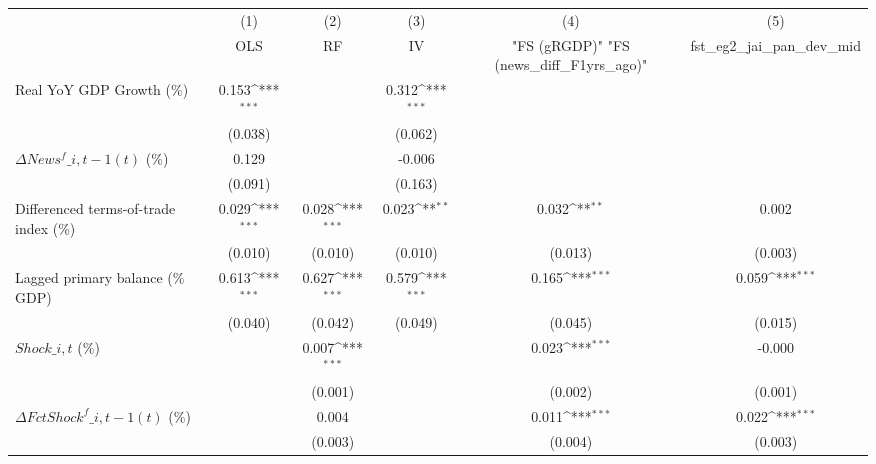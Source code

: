 {
\def\sym#1{\ifmmode^{#1}\else\(^{#1}\)\fi}
\begin{tabular}{l*{5}{c}}
\toprule
                    &\multicolumn{1}{c}{(1)}&\multicolumn{1}{c}{(2)}&\multicolumn{1}{c}{(3)}&\multicolumn{1}{c}{(4)}&\multicolumn{1}{c}{(5)}\\
                    &\multicolumn{1}{c}{OLS}&\multicolumn{1}{c}{RF}&\multicolumn{1}{c}{IV}&\multicolumn{1}{c}{ "FS (gRGDP)"  "FS (news\_diff\_F1yrs\_ago)" }&\multicolumn{1}{c}{fst\_eg2\_jai\_pan\_dev\_mid}\\
\midrule
Real YoY GDP Growth (\%)&       0.153\sym{***}&                     &       0.312\sym{***}&                     &                     \\
                    &     (0.038)         &                     &     (0.062)         &                     &                     \\
\addlinespace
$ \Delta News^f\_{i,t-1}(t)$ (\%)&       0.129         &                     &      -0.006         &                     &                     \\
                    &     (0.091)         &                     &     (0.163)         &                     &                     \\
\addlinespace
Differenced terms-of-trade index (\%)&       0.029\sym{***}&       0.028\sym{***}&       0.023\sym{**} &       0.032\sym{**} &       0.002         \\
                    &     (0.010)         &     (0.010)         &     (0.010)         &     (0.013)         &     (0.003)         \\
\addlinespace
Lagged primary balance (\% GDP)&       0.613\sym{***}&       0.627\sym{***}&       0.579\sym{***}&       0.165\sym{***}&       0.059\sym{***}\\
                    &     (0.040)         &     (0.042)         &     (0.049)         &     (0.045)         &     (0.015)         \\
\addlinespace
$ Shock\_{i,t}$ (\%) &                     &       0.007\sym{***}&                     &       0.023\sym{***}&      -0.000         \\
                    &                     &     (0.001)         &                     &     (0.002)         &     (0.001)         \\
\addlinespace
$ \Delta FctShock^f\_{i,t-1}(t)$ (\%)&                     &       0.004         &                     &       0.011\sym{***}&       0.022\sym{***}\\
                    &                     &     (0.003)         &                     &     (0.004)         &     (0.003)         \\

\end{tabular}}
